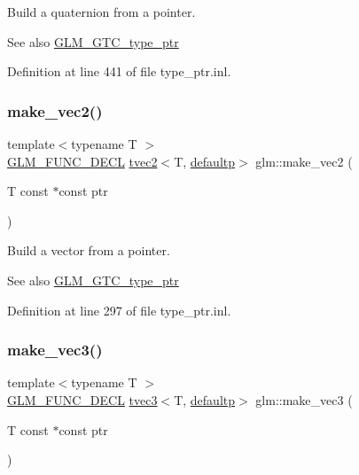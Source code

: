 Build a quaternion from a pointer. \begin{DoxySeeAlso}{See also}
\mbox{\hyperlink{group__gtc__type__ptr}{G\+L\+M\+\_\+\+G\+T\+C\+\_\+type\+\_\+ptr}} 
\end{DoxySeeAlso}


Definition at line 441 of file type\+\_\+ptr.\+inl.

\mbox{\label{group__gtc__type__ptr_ga5f7393c30970c5949be13ceb525093a6}} 
\subsubsection{\texorpdfstring{make\_vec2()}{make\_vec2()}}
{\footnotesize\ttfamily template$<$typename T $>$ \\
\mbox{\hyperlink{setup_8hpp_ab2d052de21a70539923e9bcbf6e83a51}{G\+L\+M\+\_\+\+F\+U\+N\+C\+\_\+\+D\+E\+CL}} \mbox{\hyperlink{structglm_1_1tvec2}{tvec2}}$<$T, \mbox{\hyperlink{namespaceglm_a0f04f086094c747d227af4425893f545a9d21ccd8b5a009ec7eb7677befc3bf51}{defaultp}}$>$ glm\+::make\+\_\+vec2 (\begin{DoxyParamCaption}\item[{T const $\ast$const}]{ptr }\end{DoxyParamCaption})}

Build a vector from a pointer. \begin{DoxySeeAlso}{See also}
\mbox{\hyperlink{group__gtc__type__ptr}{G\+L\+M\+\_\+\+G\+T\+C\+\_\+type\+\_\+ptr}} 
\end{DoxySeeAlso}


Definition at line 297 of file type\+\_\+ptr.\+inl.

\mbox{\label{group__gtc__type__ptr_ga86f4bc63570db86346db2e567fb760f6}} 
\subsubsection{\texorpdfstring{make\_vec3()}{make\_vec3()}}
{\footnotesize\ttfamily template$<$typename T $>$ \\
\mbox{\hyperlink{setup_8hpp_ab2d052de21a70539923e9bcbf6e83a51}{G\+L\+M\+\_\+\+F\+U\+N\+C\+\_\+\+D\+E\+CL}} \mbox{\hyperlink{structglm_1_1tvec3}{tvec3}}$<$T, \mbox{\hyperlink{namespaceglm_a0f04f086094c747d227af4425893f545a9d21ccd8b5a009ec7eb7677befc3bf51}{defaultp}}$>$ glm\+::make\+\_\+vec3 (\begin{DoxyParamCaption}\item[{T const $\ast$const}]{ptr }\end{DoxyParamCaption})}

